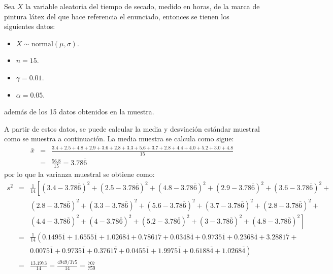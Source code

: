 \begin{solucion}
 Sea $X$ la variable aleatoria del tiempo de secado, medido en horas, de la marca de pintura l\'atex del que hace referencia el enunciado, entonces se tienen los siguientes datos:
 \begin{itemize}
  \item $X\sim\text{normal}(\mu,\sigma)$.
  \item $n=15$.
  \item $\gamma=0.01$.
  \item $\alpha=0.05$.
 \end{itemize}
 adem\'as de los 15 datos obtenidos en la muestra.
 \par 
 A partir de estos datos, se puede calcular la media y desviaci\'on est\'andar muestral como se muestra a continuaci\'on. La media muestra se calcula como sigue:
 \begin{eqnarray*}
  \bar{x} & = & \frac{3.4+2.5+4.8+2.9 + 3.6+2.8+3.3+5.6+3.7+2.8+4.4 + 4.0+5.2+3.0+4.8}{15} \\
  & = & \frac{56.8}{15} = 3.78\overline{6}
 \end{eqnarray*}
 por lo que la varianza muestral se obtiene como:
 \begin{eqnarray*}
  s^2 & = & \frac{1}{14}\left[ \left(3.4 - 3.78\overline{6} \right)^2 + \left(2.5 - 3.78\overline{6} \right)^2 + \left(4.8 - 3.78\overline{6} \right)^2 + \left(2.9 - 3.78\overline{6} \right)^2 + \left(3.6 - 3.78\overline{6} \right)^2 + \right. \\
  & & \left. \left(2.8 - 3.78\overline{6} \right)^2 + \left(3.3 - 3.78\overline{6} \right)^2 + \left(5.6 - 3.78\overline{6} \right)^2 + \left(3.7 - 3.78\overline{6} \right)^2 + \left(2.8 - 3.78\overline{6} \right)^2 + \right. \\
  & & \left. \left(4.4 - 3.78\overline{6} \right)^2 + \left(4 - 3.78\overline{6} \right)^2 + \left(5.2 - 3.78\overline{6} \right)^2 + \left(3 - 3.78\overline{6} \right)^2 + \left(4.8 - 3.78\overline{6} \right)^2 \right] \\
  & = & \frac{1}{14}\left( 0.1495\overline{1} + 1.6555\overline{1} + 1.0268\overline{4} + 0.7861\overline{7} + 0.0348\overline{4} + 0.9735\overline{1} + 0.2368\overline{4} + 3.2881\overline{7} + \right. \\
  & & \left. 
  0.0075\overline{1} + 0.9735\overline{1} + 0.3761\overline{7} + 0.0455\overline{1} + 1.9975\overline{1} + 0.6188\overline{4} + 1.0268\overline{4} \right) \\
  & = & \frac{13.197\overline{3}}{14} = \frac{4949/375}{14} = \frac{707}{750} \\

\end{eqnarray*}
\end{solucion}
